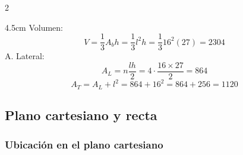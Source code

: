 {\begin{multicols}{2}
\begin{parts}
                \begin{solutionbox}{4.5cm}
                    Volumen: 
                     \[V=\dfrac{1}{3}A_b h= \dfrac{1}{3}l^2h= \dfrac{1}{3}16^2(27)=2304\]
                 A. Lateral:
                     \[A_L=n\dfrac{lh}{2}=4\cdot \dfrac{16\times 27}{2}=864\]
                     \[A_T=A_L+l^2=864+16^2=864+256=1120\]
                     \end{solutionbox}
 

            \end{parts}
        \end{multicols}
    }

    \subsection{Plano cartesiano y recta}

    \subsubsection{Ubicación en el plano cartesiano}

